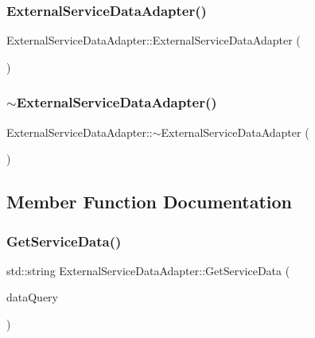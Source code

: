 \subsubsection{\texorpdfstring{ExternalServiceDataAdapter()}{ExternalServiceDataAdapter()}\hspace{0.1cm}{\footnotesize\ttfamily [2/2]}}
{\footnotesize\ttfamily External\+Service\+Data\+Adapter\+::\+External\+Service\+Data\+Adapter (\begin{DoxyParamCaption}{ }\end{DoxyParamCaption})}

\mbox{\label{class_external_service_data_adapter_a580d0c8f5d86073248afa2a033f1b69c}} 
\subsubsection{\texorpdfstring{$\sim$ExternalServiceDataAdapter()}{~ExternalServiceDataAdapter()}\hspace{0.1cm}{\footnotesize\ttfamily [2/2]}}
{\footnotesize\ttfamily External\+Service\+Data\+Adapter\+::$\sim$\+External\+Service\+Data\+Adapter (\begin{DoxyParamCaption}{ }\end{DoxyParamCaption})}



\subsection{Member Function Documentation}
\mbox{\label{class_external_service_data_adapter_aef7b123ab3e636ec263b609dae8bc4e7}} 
\subsubsection{\texorpdfstring{GetServiceData()}{GetServiceData()}\hspace{0.1cm}{\footnotesize\ttfamily [1/2]}}
{\footnotesize\ttfamily std\+::string External\+Service\+Data\+Adapter\+::\+Get\+Service\+Data (\begin{DoxyParamCaption}\item[{\mbox{\hyperlink{_class_adapter_2_class_adapter_2_data_8h_aacb79576e5cf053ee9c93cb9d665e32b}{T\+Y\+P\+ES}}}]{data\+Query }\end{DoxyParamCaption})\hspace{0.3cm}{\ttfamily [virtual]}}



